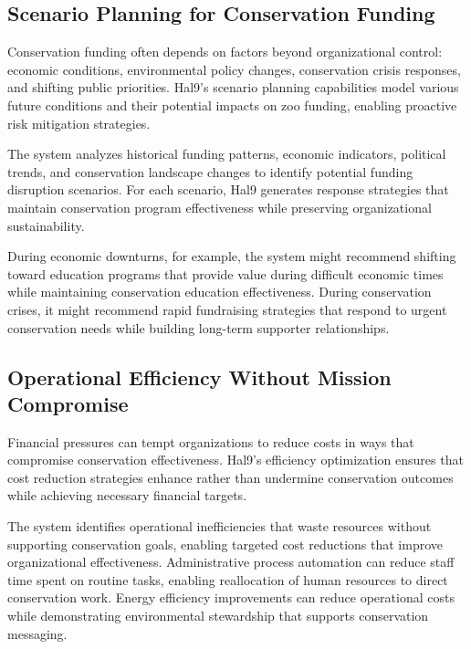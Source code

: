 \documentclass[
  Letterpaper,
]{scrbook}
\begin{document}
\subsection{Scenario Planning for Conservation
Funding}\label{scenario-planning-for-conservation-funding}

Conservation funding often depends on factors beyond organizational
control: economic conditions, environmental policy changes, conservation
crisis responses, and shifting public priorities. Hal9's scenario
planning capabilities model various future conditions and their
potential impacts on zoo funding, enabling proactive risk mitigation
strategies.

The system analyzes historical funding patterns, economic indicators,
political trends, and conservation landscape changes to identify
potential funding disruption scenarios. For each scenario, Hal9
generates response strategies that maintain conservation program
effectiveness while preserving organizational sustainability.

During economic downturns, for example, the system might recommend
shifting toward education programs that provide value during difficult
economic times while maintaining conservation education effectiveness.
During conservation crises, it might recommend rapid fundraising
strategies that respond to urgent conservation needs while building
long-term supporter relationships.

\subsection{Operational Efficiency Without Mission
Compromise}\label{operational-efficiency-without-mission-compromise}

Financial pressures can tempt organizations to reduce costs in ways that
compromise conservation effectiveness. Hal9's efficiency optimization
ensures that cost reduction strategies enhance rather than undermine
conservation outcomes while achieving necessary financial targets.

The system identifies operational inefficiencies that waste resources
without supporting conservation goals, enabling targeted cost reductions
that improve organizational effectiveness. Administrative process
automation can reduce staff time spent on routine tasks, enabling
reallocation of human resources to direct conservation work. Energy
efficiency improvements can reduce operational costs while demonstrating
environmental stewardship that supports conservation messaging.
\end{document}
